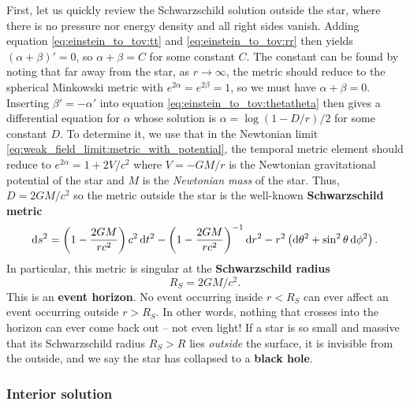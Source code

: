 First, let us quickly review the Schwarzschild solution outside the star, where there is no pressure nor energy density and all right sides vanish.
Adding equation \eqref{eq:einstein_to_tov:tt} and \eqref{eq:einstein_to_tov:rr} then yields $(\alpha + \beta)' = 0$, so $\alpha + \beta = C$ for some constant $C$.
The constant can be found by noting that far away from the star, as $r \rightarrow \infty$, the metric should reduce to the spherical Minkowski metric with $e^{2\alpha} = e^{2 \beta} = 1$, so we must have $\alpha + \beta = 0$.
Inserting $\beta' = -\alpha'$ into equation \eqref{eq:einstein_to_tov:thetatheta} then gives a differential equation for $\alpha$ whose solution is $\alpha = \log \left( 1 - D / r \right) / 2$ for some constant $D$.
To determine it, we use that in the Newtonian limit \eqref{eq:weak_field_limit:metric_with_potential}, the temporal metric element should reduce to $e^{2 \alpha} = 1 + 2 V / c^2$ where $V = - G M / r$ is the Newtonian gravitational potential of the star and $M$ is the \emph{Newtonian mass} of the star.
Thus, $D = 2 G M / c^2$ so the metric outside the star is the well-known \textbf{Schwarzschild metric}
\begin{equation}
	\mathop{}\!\mathrm{d} s^2 = \left( 1 - \frac{2 G M}{r c^2} \right) c^2 \mathop{}\!\mathrm{d} t^2 - \left( 1 - \frac{2 G M}{r c^2} \right)^{-1} \mathop{}\!\mathrm{d} r^2 - r^2 \left( \mathop{}\!\mathrm{d} \theta^2 + \sin^2 \theta \mathop{}\!\mathrm{d} \phi^2 \right) .
\label{eq:tov:schwarzschild_metric}
\end{equation}
In particular, this metric is singular at the \textbf{Schwarzschild radius}
\begin{equation}
	R_S = 2 G M / c^2.
\label{eq:tov:schwarzschild_radius}
\end{equation}
This is an \textbf{event horizon}.
No event occurring inside $r < R_S$ can ever affect an event occurring outside $r > R_S$. \cite[section 5.6]{ref:carroll}
In other words, nothing that crosses into the horizon can ever come back out -- not even light!
If a star is so small and massive that its Schwarzschild radius $R_S > R$ lies \emph{outside} the surface, it is invisible from the outside, and we say the star has collapsed to a \textbf{black hole}.

\subsubsection{Interior solution}

